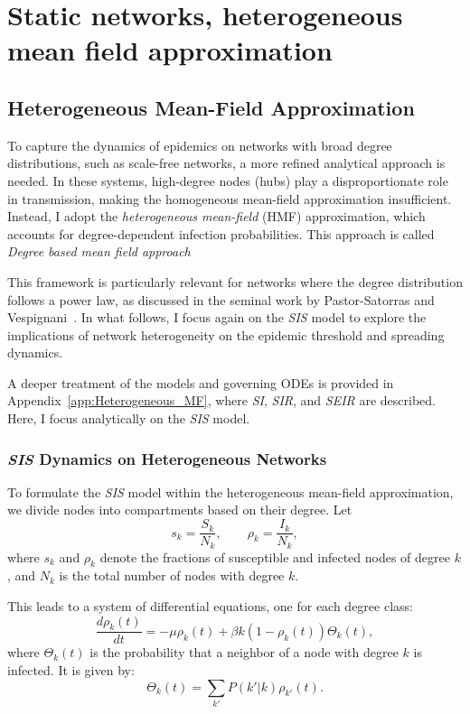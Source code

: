 \chapter{Static networks, heterogeneous mean field approximation}


\section{Heterogeneous Mean-Field Approximation}

To capture the dynamics of epidemics on networks with broad degree distributions, such as scale-free networks, a more refined analytical approach is needed. In these systems, high-degree nodes (hubs) play a disproportionate role in transmission, making the homogeneous mean-field approximation insufficient. Instead, I adopt the \textit{heterogeneous mean-field} (HMF) approximation, which accounts for degree-dependent infection probabilities. This approach is called \textit{Degree based mean field approach}

This framework is particularly relevant for networks where the degree distribution follows a power law, as discussed in the seminal work by Pastor-Satorras and Vespignani~\cite{pastor2001epidemic}. In what follows, I focus again on the \textit{SIS} model to explore the implications of network heterogeneity on the epidemic threshold and spreading dynamics.

A deeper treatment of the models and governing ODEs is provided in Appendix~\ref{app:Heterogeneous_MF}, where \textit{SI}, \textit{SIR}, and \textit{SEIR} are described. Here, I focus analytically on the \textit{SIS} model.

\subsection{\textit{SIS} Dynamics on Heterogeneous Networks}
To formulate the \textit{SIS} model within the heterogeneous mean-field approximation, we divide nodes into compartments based on their degree. Let  
\[
s_k = \frac{S_k}{N_k}, \qquad \rho_k = \frac{I_k}{N_k},
\]  
where \(s_k\) and \(\rho_k\) denote the fractions of susceptible and infected nodes of degree \(k\), and \(N_k\) is the total number of nodes with degree \(k\).

This leads to a system of differential equations, one for each degree class: 
\begin{equation}
\frac{d\rho_k(t)}{dt} = -\mu \rho_k(t) + \beta k \left(1 - \rho_k(t)\right)\Theta_k(t),
\label{eq:SIS_heterogeneous_network_dynamics}
\end{equation}
where \(\Theta_k(t)\) is the probability that a neighbor of a node with degree \(k\) is infected. It is given by:
\[
\Theta_k(t) = \sum_{k'} P(k'|k) \rho_{k'}(t).
\]

